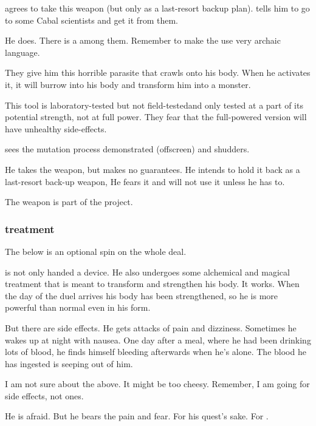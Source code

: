 \Teshrial{} agrees to take this weapon (but only as a last-resort backup plan). 
\Azraid{} tells him to go to some Cabal scientists and get it from them. 

He does. 
There is a \banelord{} among them. 
Remember to make the \banelord{} use very archaic language. 

They give him this horrible parasite that crawls onto his body. 
When he activates it, it will burrow into his body and transform him into a monster. 

This tool is laboratory-tested but not field-tested\prikker and only tested at a part of its potential strength, not at full power. 
They fear that the full-powered version will have unhealthy side-effects. 

\Teshrial{} sees the mutation process demonstrated (offscreen) and shudders. 

He takes the weapon, but makes no guarantees. 
He intends to hold it back as a last-resort back-up weapon, 
He fears it and will not use it unless he has to. 

The weapon is part of the  project. 





\subsubsection{\NeoResphan{} treatment}
The below is an optional spin on the whole  deal. 

\Teshrial{} is not only handed a device. 
He also undergoes some alchemical and magical treatment that is meant to transform and strengthen his body. 
It works. 
When the day of the duel arrives his body has been strengthened, so he is more powerful than normal even in his \resphan{} form. 

But there are side effects. 
He gets attacks of pain and dizziness. 
Sometimes he wakes up at night with nausea. 
One day after a meal, where he had been drinking lots of blood, he finds himself bleeding afterwards when he's alone. 
The blood he has ingested is seeping out of him. 

I am not sure about the above. 
It might be too cheesy. 
Remember, I am going for  side effects, not  ones. 

He is afraid. 
But he bears the pain and fear. 
For his quest's sake. 
For \Firaxel. 





